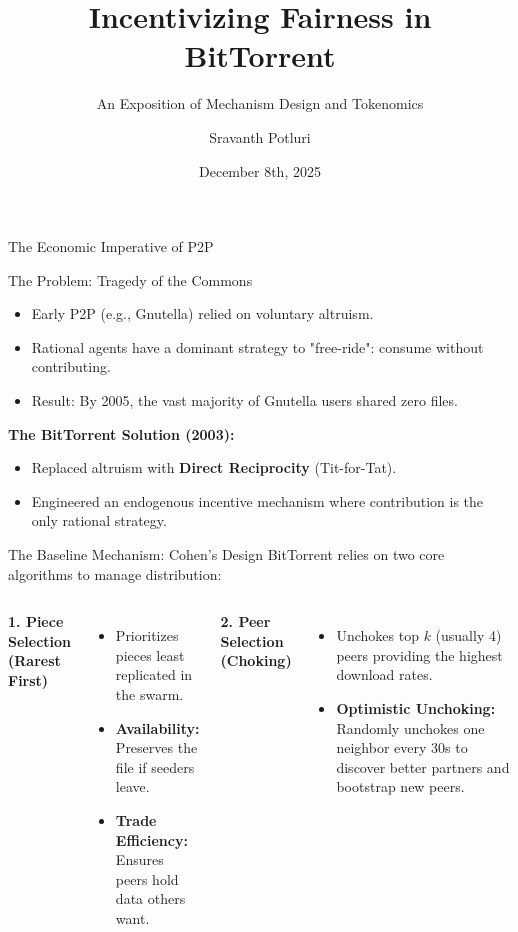 \documentclass[aspectratio=169]{beamer}
\title[Incentivizing Fairness in BitTorrent]{Incentivizing Fairness in BitTorrent}
\subtitle{An Exposition of Mechanism Design and Tokenomics}
\author{Sravanth Potluri}
\institute{University of Virginia}
\date{December 8th, 2025}
\begin{document}
\begin{frame}
    \titlepage
\end{frame}

\begin{frame}{The Economic Imperative of P2P}
    \begin{block}{The Problem: Tragedy of the Commons}
        \begin{itemize}
            \item Early P2P (e.g., Gnutella) relied on voluntary altruism.
            \item Rational agents have a dominant strategy to "free-ride": consume without contributing.
            \item Result: By 2005, the vast majority of Gnutella users shared zero files.
        \end{itemize}
    \end{block}

    \vspace{0.5cm}
    \textbf{The BitTorrent Solution (2003):}
    \begin{itemize}
        \item Replaced altruism with \textbf{Direct Reciprocity} (Tit-for-Tat).
        \item Engineered an endogenous incentive mechanism where contribution is the only rational strategy.
    \end{itemize}
\end{frame}

\begin{frame}{The Baseline Mechanism: Cohen's Design}
    BitTorrent relies on two core algorithms to manage distribution:

    \begin{columns}
        \textbf{1. Piece Selection (Rarest First)}
        \begin{itemize}
            \item Prioritizes pieces least replicated in the swarm.
            \item \textbf{Availability:} Preserves the file if seeders leave.
            \item \textbf{Trade Efficiency:} Ensures peers hold data others want.
        \end{itemize}

        \textbf{2. Peer Selection (Choking)}
        \begin{itemize}
            \item Unchokes top $k$ (usually 4) peers providing the highest download rates.
            \item \textbf{Optimistic Unchoking:} Randomly unchokes one neighbor every 30s to discover better partners and bootstrap new peers.
        \end{itemize}
    \end{columns}
\end{frame}
\end{document}
